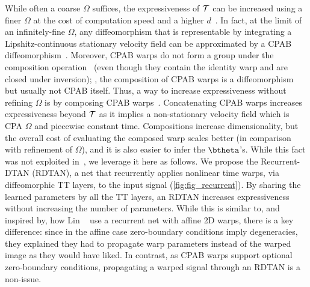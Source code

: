 While often a coarse $\Omega$ %
suffices,
the expressiveness of $\mathcal{T}$ can be increased
using a finer $\Omega$ at the cost of 
computation speed and a higher $d$~\cite{Freifeld:ICCV:2015:CPAB,Freifeld:PAMI:2017:CPAB}. In fact, 
at the limit of
an infinitely-fine $\Omega$, 
any diffeomorphism that is representable by integrating a Lipshitz-continuous stationary velocity field can be approximated by a CPAB diffeomorphism~\cite{Freifeld:ICCV:2015:CPAB,Freifeld:PAMI:2017:CPAB}.
Moreover, CPAB warps do not form a group under the composition operation~\cite{Freifeld:PAMI:2017:CPAB}
(even though they contain the identity warp and are closed under inversion); \ie,
the composition of CPAB warps is a diffeomorphism but usually not CPAB itself.
Thus, a way to increase expressiveness without refining $\Omega$ is by composing  CPAB warps~\cite{Freifeld:PAMI:2017:CPAB}.
Concatenating CPAB warps increases expressiveness beyond $\mathcal{T}$ as it implies a non-stationary velocity field
which is CPA \wrt $\Omega$ and piecewise constant \wrt time.
Compositions increase dimensionality, but the overall cost of evaluating the composed warp scales better (in comparison with refinement of $\Omega$), and it is also easier to infer the $\btheta$'s. 
While this fact was not exploited in~\cite{Skafte:CVPR:2018:DDTN}, we leverage it here as follows.
We propose the Recurrent-DTAN (RDTAN), a net that recurrently applies nonlinear time warps, via diffeomorphic TT layers, to the input signal (\autoref{fig:fig_recurrent}). By sharing the learned parameters by all the TT layers, an RDTAN increases expressiveness without increasing the number of parameters. 
While this is similar to, and inspired by, how Lin \etal~\cite{Lin:CPVR:2017:inverse}
use a recurrent net with affine 2D warps, there is a key difference:
since in the affine case zero-boundary conditions imply degeneracies, they explained they had to propagate warp parameters instead of the warped image as they would have liked. In contrast, as CPAB warps support optional zero-boundary conditions, propagating a warped signal through an RDTAN is a non-issue.

